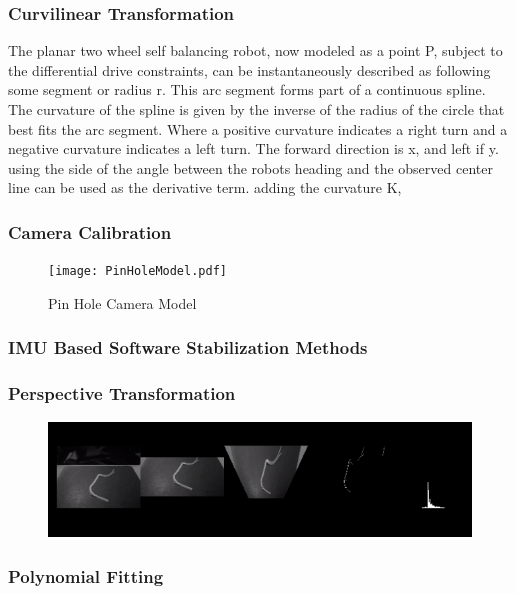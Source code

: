         \subsubsection{Curvilinear Transformation}
        The planar two wheel self balancing robot, now modeled as a point P, subject to the differential drive constraints, 
        can be instantaneously described as following some segment or radius r. This arc segment forms part of a continuous spline. 
        The curvature of the spline is given by the inverse of the radius of the circle that best fits the arc segment.
        Where a positive curvature indicates a right turn and a negative curvature indicates a left turn.
        The forward direction is x, and left if y. using the side of the angle between the robots heading and the observed center line can be used as the derivative term.
        adding the curvature K, 
            \subsubsection{Camera Calibration}
            \begin{figure}
            \texttt{[image: PinHoleModel.pdf]}
            \caption{Pin Hole Camera Model}
            \end{figure}

            \subsubsection{IMU Based Software Stabilization Methods}
            \subsubsection{Perspective Transformation}
            \begin{figure}
            \includegraphics[width=\textwidth]{VisionPipelineRes.png}
            \end{figure}
            \subsubsection{Polynomial Fitting}
